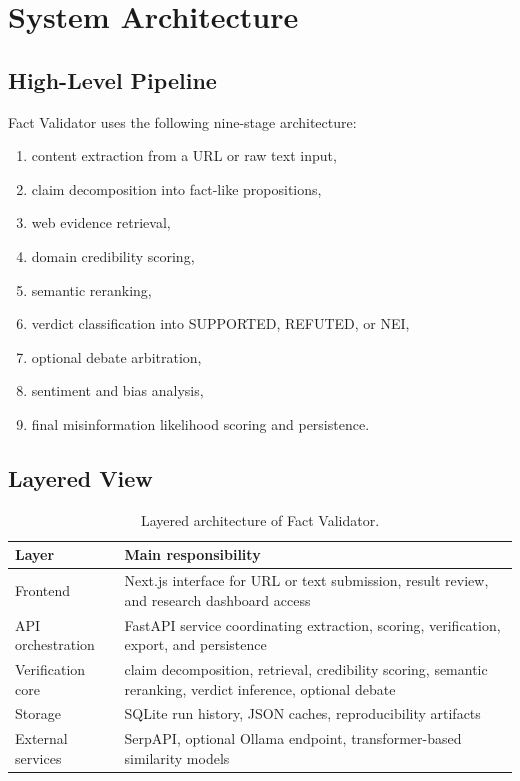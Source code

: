 \documentclass[12pt,a4paper,openright]{report}
\begin{document}
\chapter{System Architecture}

\section{High-Level Pipeline}

Fact Validator uses the following nine-stage architecture:

\begin{enumerate}
  \item content extraction from a URL or raw text input,
  \item claim decomposition into fact-like propositions,
  \item web evidence retrieval,
  \item domain credibility scoring,
  \item semantic reranking,
  \item verdict classification into SUPPORTED, REFUTED, or NEI,
  \item optional debate arbitration,
  \item sentiment and bias analysis,
  \item final misinformation likelihood scoring and persistence.
\end{enumerate}

\section{Layered View}

\begin{table}[H]
\centering
\caption{Layered architecture of Fact Validator.}
\begin{tabular}{p{3cm}p{9.5cm}}
\toprule
Layer & Main responsibility \\
\midrule
Frontend & Next.js interface for URL or text submission, result review, and research dashboard access \\
API orchestration & FastAPI service coordinating extraction, scoring, verification, export, and persistence \\
Verification core & claim decomposition, retrieval, credibility scoring, semantic reranking, verdict inference, optional debate \\
Storage & SQLite run history, JSON caches, reproducibility artifacts \\
External services & SerpAPI, optional Ollama endpoint, transformer-based similarity models \\
\bottomrule
\end{tabular}
\end{table}
\end{document}
